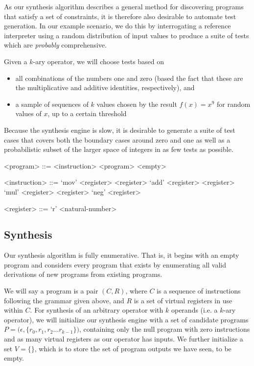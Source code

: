 \documentclass{article}
\begin{document}
As our synthesis algorithm describes a general method for discovering programs
that satisfy a set of constraints, it is therefore also desirable to automate
test generation.  In our example scenario, we do this by interrogating a
reference interpreter using a random distribution of input values to produce
a suite of tests which are \textit{probably} comprehensive.

Given a $k$-ary operator, we will choose tests based on
\begin{itemize}
    \item all combinations of the numbers one and zero (based the fact that
	these are the multiplicative and additive identities, respectively),
	and
    \item a sample of sequences of $k$ values chosen by the result $f(x)=x^{9}$
	for random values of $x$, up to a certain threshold
\end{itemize}

Because the synthesis engine is slow, it is desirable to generate a suite of
test cases that covers both the boundary cases around zero and one as well as
a probabilistic subset of the larger space of integers in as few tests as
possible.

\begin{grammar}

<program> ::= <instruction> <program>
\alt <empty>

<instruction> ::= `mov' <register> <register>
\alt `add' <register> <register>
\alt `mul' <register> <register>
\alt `neg' <register>

<register> ::= `r' <natural-number>

\end{grammar}

\subsection{Synthesis}

Our synthesis algorithm is fully enumerative.  That is, it begins with an empty
program and considers every program that exists by enumerating all valid
derivations of new programs from existing programs.

We will say a program is a pair $(C,R)$, where $C$ is a sequence of
instructions following the grammar given above, and $R$ is a set of virtual
registers in use within $C$.  For synthesis of an arbitrary operator with $k$
operands (i.e. a $k$-ary operator), we will initialize our synthesis engine
with a set of candidate programs $P = {(\epsilon, \{r_{0}, r_{1}, r_{2} \ldots
r_{k-1}}\})$, containing only the null program with zero instructions and as
many virtual registers as our operator has inputs. We further initialize a set
$V = \{\}$, which is to store the set of program outputs we have seen, to be
empty.
\end{document}
